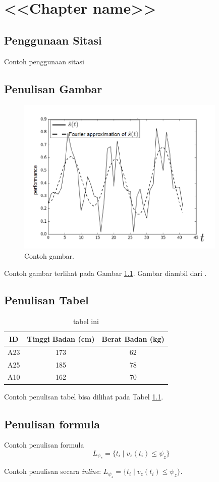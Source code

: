 \chapter{<<Chapter name>>}


\section{Penggunaan Sitasi}
Contoh penggunaan sitasi \cite{lukito2016,santosa2011user}
\cite{setiawan2014fuzzy} \cite{wibowo2014line} \cite{marenda2016digitory} \cite{wibirama2013dual,wibowo2016clustering}

\section{Penulisan Gambar}

\begin{figure}[h]
	\centering
	\includegraphics[width=10cm]{contents/chapter-1/sample-fig.png}
	\caption{Contoh gambar.}
	\label{Fig: Contoh gambar}
\end{figure}

Contoh gambar terlihat pada Gambar \ref{Fig: Contoh gambar}. Gambar diambil dari \cite{wibowo2016clustering}.

\section{Penulisan Tabel}
\begin{table}[h]
	\caption{tabel ini}
	\vspace{0.5em}
	\centering
	\begin{tabular}{|c|c|c|}
		\hline
		ID & Tinggi Badan (cm) & Berat Badan (kg) \\
		\hline \hline
		A23 & 173 & 62 \\
		A25 & 185 & 78 \\
		A10 & 162 & 70 \\ \hline
	\end{tabular}
	\label{Tab: Tabel Tinggi Berat}
\end{table}
Contoh penulisan tabel bisa dilihat pada Tabel \ref{Tab: Tabel Tinggi Berat}.

\section{Penulisan formula}
Contoh penulisan formula
\begin{equation}
L_{\psi_z} = \{ t_i \mid v_z(t_i) \le \psi_z \}
\end{equation}

Contoh penulisan secara \textit{inline}: $L_{\psi_z} = \{ t_i \mid v_z(t_i) \le \psi_z \}$.

